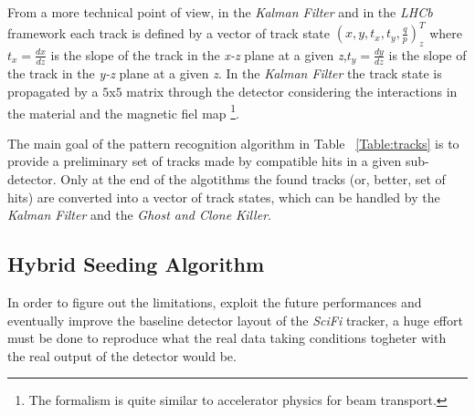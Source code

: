 \documentclass[paper=a4, fontsize=10pt]{scrartcl}
\numberwithin{equation}{section}		%
\numberwithin{figure}{section}			%
\numberwithin{table}{section}				%
\begin{document}
From a more technical point of view, in the \textit{Kalman Filter} and in the \textit{LHCb} framework each track is defined by a vector of track state $\left( x, y, t_{x}, t_{y} , \frac{q}{p} \right)_{z}^{T}$ where $t_x = \frac{dx}{dz}$ is the slope of the track in the \textit{x-z} plane at a given \textit{z},$t_y=\frac{dy}{dz}$ is the slope of the track in the \textit{y-z} plane at a given \textit{z}. In the \textit{Kalman Filter} the track state is propagated by a $5$x$5$ matrix through the detector considering the interactions in the material and the magnetic fiel map \footnote{The formalism is quite similar to accelerator physics for beam transport.}. 

The main goal of the pattern recognition algorithm in Table ~\ref{Table:tracks} is to provide a preliminary set of tracks made by compatible hits in a given sub-detector. Only at the end of the algotithms the found tracks (or, better, set of hits) are converted into a vector of track states, which can be handled by the \textit{Kalman Filter} and the \textit{Ghost and Clone Killer}.

\subsection{Hybrid Seeding Algorithm}
In order to figure out the limitations, exploit the future performances and eventually improve the baseline detector layout of the \textit{SciFi} tracker, a huge effort must be done to reproduce what the real data taking conditions togheter with  the real output of the detector would be. 
\end{document}
